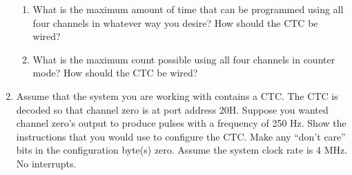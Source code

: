 \begin{enumerate}
\begin{enumerate}
\item What is the maximum amount of time that can be
programmed using all four channels in whatever way you desire? How should
the CTC be wired?

\item What is the maximum count possible using all four
channels in counter mode? How should the CTC be wired?

\end{enumerate}

\item Assume that the system you are working with contains a CTC.
The CTC is decoded so that channel zero is at port address 20H. Suppose you
wanted channel zero's output to produce pulses with a frequency of 250 Hz.
Show the instructions that you would use to configure the CTC. Make any
``don't care'' bits in the configuration byte(s) zero. Assume the system
clock rate is 4 MHz. No interrupts.

\end{enumerate}


